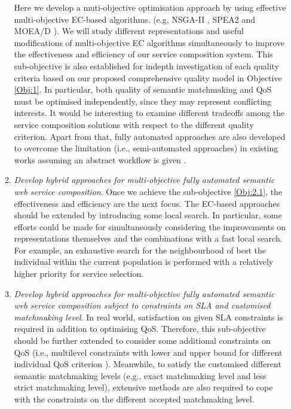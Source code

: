 \begin{enumerate}
\begin{enumerate}
    Here we develop a muti-objective optimisation approach by using effective multi-objective EC-based algorithms. (e.g, NSGA-II \cite{deb2002fast}, SPEA2 \cite{zitzler2001spea2} and MOEA/D \cite{zhang2007moea}). We will study different representations and useful modifications of multi-objective EC algorithms simultaneously to improve the effectiveness and efficiency of our service composition system. This sub-objective is also established for indepth investigation of each quality criteria based on our proposed comprehensive quality model in Objective \ref{Obj:1}.  In particular, both quality of semantic matchmaking and QoS must be optimised independently, since they may represent conflicting interests. It would be interesting to examine different tradeoffs among the service composition solutions with respect to the different quality criterion. Apart from that, fully automated approaches are also developed to overcome the limitation (i.e., semi-automated approaches) in existing works assuming an abstract workflow is given .
   
    \item \emph{Develop hybrid approaches for multi-objective fully automated semantic web service composition}. Once we achieve the sub-objective \ref{Obj:2.1}, the effectiveness and efficiency are the next focus. The EC-based approaches should be extended by introducing some local search.  In particular, some efforts could be made for simultaneously considering the improvements on representations themselves and the combinations with a fast local search. For example, an exhaustive search for the neighbourhood of best the individual within the current population is performed with a relatively higher priority for service selection.

    \item \emph{Develop hybrid approaches for multi-objective fully automated semantic web service composition subject to constraints on SLA and customised matchmaking level}. In real world, satisfaction on given SLA constraints is required in addition to optimising QoS. Therefore, this sub-objective should be further extended to consider some additional constraints on  QoS (i.e., multilevel constraints with lower and upper bound for different individual QoS criterion \cite{yin2014hybrid}). Meanwhile, to satisfy the customised different semantic matchmaking levels (e.g., exact matchmaking level and less strict matchmaking level), extensive methods are also required to cope with the constraints on the different accepted matchmaking level.


\end{enumerate}
\end{enumerate}
